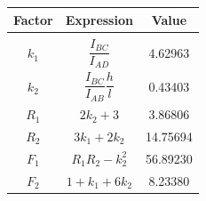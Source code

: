\begin{table}[h!]
\centering
\begin{tabular}{ c c c }
    Factor   & Expression & Value       \\ \hline \\
    $k_1$    & $\dfrac{I_{BC}}{I_{AD}}$                 & 4.62963  \\
    $k_2$    & $\dfrac{I_{BC}}{I_{AB}}\dfrac{h}{l}$     & 0.43403  \\
    $R_1$    & $2k_2+3$                                 & 3.86806  \\
    $R_2$    & $3k_1+2k_2$                              & 14.75694 \\
    $F_1$    & $R_1R_2 - k_2^2$                         & 56.89230 \\
    $F_2$    & $1+k_1+6k_2$                             & 8.23380  \\
\end{tabular}
\end{table}


%
%

